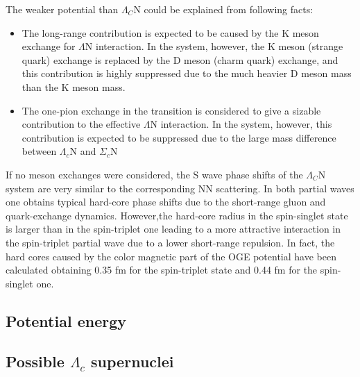\documentclass[12pt,a4paper]{book}
\begin{document}
	The weaker potential than $\Lambda_C$N could be explained from following facts: 
	\begin{itemize}
		\item The long-range contribution is expected to be caused by the K meson exchange for $\Lambda$N interaction. In the system, however, the K meson (strange quark) exchange is replaced by the D meson (charm quark) exchange, and this contribution is highly suppressed due to the much heavier D meson mass than the K meson mass.
		\item The one-pion exchange in the transition is considered to give a sizable contribution to the effective $\Lambda$N interaction. In the system, however, this contribution is expected to be suppressed due to the large mass difference between $\Lambda_c$N and $\Sigma_c$N 
		
	\end{itemize}  
	If no meson exchanges were considered, the S wave phase shifts of the $\Lambda_C$N system are very similar to the corresponding NN scattering. In both partial waves one obtains typical	hard-core phase shifts due to the short-range gluon and quark-exchange dynamics. However,the hard-core radius in the spin-singlet state is larger than in the spin-triplet one leading	to a more attractive interaction in the spin-triplet partial wave due to a lower short-range repulsion. In fact, the hard cores caused by the color magnetic part of the OGE potential have been calculated obtaining 0.35 fm for the spin-triplet state and 0.44 fm	for the spin-singlet one.
	
	\subsection{Potential energy}
	
	
	
	\subsection{Possible $\Lambda_c$ supernuclei}
	
\end{document}
